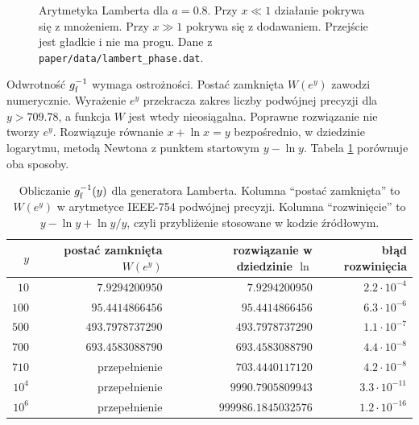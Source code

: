\documentclass[11pt,a4paper]{article}
\begin{document}
\begin{figure}[t]
\centering
{}
\caption{Arytmetyka Lamberta dla $a=0.8$. Przy $x\ll1$ działanie pokrywa się
z mnożeniem. Przy $x\gg1$ pokrywa się z dodawaniem. Przejście jest gładkie
i nie ma progu. Dane z \texttt{paper/data/lambert\_phase.dat}.}
\label{fig:phase}
\end{figure}

Odwrotność $g_{\mathrm{f}}^{-1}$ wymaga ostrożności. Postać zamknięta $W(e^{y})$ zawodzi
numerycznie. Wyrażenie $e^{y}$ przekracza zakres liczby podwójnej precyzji dla
$y>709.78$, a funkcja $W$ jest wtedy nieosiągalna. Poprawne rozwiązanie nie
tworzy $e^{y}$. Rozwiązuje równanie $x+\ln x=y$ bezpośrednio, w dziedzinie
logarytmu, metodą Newtona z punktem startowym $y-\ln y$. Tabela
\ref{tab:lambert} porównuje oba sposoby.

\begin{table}[t]
\centering
\small
\caption{Obliczanie $g_{\mathrm{f}}^{-1}(y)$ dla generatora Lamberta. Kolumna \enquote{postać
zamknięta} to $W(e^{y})$ w arytmetyce IEEE-754 podwójnej precyzji. Kolumna
\enquote{rozwinięcie} to $y-\ln y+\ln y/y$, czyli przybliżenie stosowane w kodzie
źródłowym.}
\label{tab:lambert}
\begin{tabular}{@{}rrrr@{}}
\toprule
$y$ & postać zamknięta $W(e^{y})$ & rozwiązanie w dziedzinie $\ln$ & błąd rozwinięcia \\
\midrule
$10$      & $7.9294200950$  & $7.9294200950$  & $2.2\cdot10^{-4}$ \\
$100$     & $95.4414866456$ & $95.4414866456$ & $6.3\cdot10^{-6}$ \\
$500$     & $493.7978737290$& $493.7978737290$& $1.1\cdot10^{-7}$ \\
$700$     & $693.4583088790$& $693.4583088790$& $4.4\cdot10^{-8}$ \\
$710$     & przepełnienie   & $703.4440117120$& $4.2\cdot10^{-8}$ \\
$10^{4}$  & przepełnienie   & $9990.7905809943$ & $3.3\cdot10^{-11}$ \\
$10^{6}$  & przepełnienie   & $999986.1845032576$ & $1.2\cdot10^{-16}$ \\
\bottomrule
\end{tabular}
\end{table}
\end{document}
